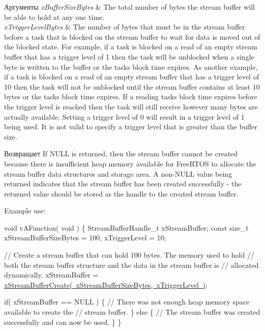 \begin{DoxyParams}{Аргументы}
{\em x\+Buffer\+Size\+Bytes} & The total number of bytes the stream buffer will be able to hold at any one time.\\
\hline
{\em x\+Trigger\+Level\+Bytes} & The number of bytes that must be in the stream buffer before a task that is blocked on the stream buffer to wait for data is moved out of the blocked state. For example, if a task is blocked on a read of an empty stream buffer that has a trigger level of 1 then the task will be unblocked when a single byte is written to the buffer or the task\textquotesingle{}s block time expires. As another example, if a task is blocked on a read of an empty stream buffer that has a trigger level of 10 then the task will not be unblocked until the stream buffer contains at least 10 bytes or the task\textquotesingle{}s block time expires. If a reading task\textquotesingle{}s block time expires before the trigger level is reached then the task will still receive however many bytes are actually available. Setting a trigger level of 0 will result in a trigger level of 1 being used. It is not valid to specify a trigger level that is greater than the buffer size.\\
\hline
\end{DoxyParams}
\begin{DoxyReturn}{Возвращает}
If N\+U\+LL is returned, then the stream buffer cannot be created because there is insufficient heap memory available for Free\+R\+T\+OS to allocate the stream buffer data structures and storage area. A non-\/\+N\+U\+LL value being returned indicates that the stream buffer has been created successfully -\/ the returned value should be stored as the handle to the created stream buffer.
\end{DoxyReturn}
Example use\+: 
\begin{DoxyPre}\end{DoxyPre}



\begin{DoxyPre}void vAFunction( void )
\{
StreamBufferHandle\_t xStreamBuffer;
const size\_t xStreamBufferSizeBytes = 100, xTriggerLevel = 10;\end{DoxyPre}



\begin{DoxyPre}    // Create a stream buffer that can hold 100 bytes.  The memory used to hold
    // both the stream buffer structure and the data in the stream buffer is
    // allocated dynamically.
    xStreamBuffer = \mbox{\hyperlink{stream__buffer_8h_a39aa4dd8b83e2df7ded291f863fb5fed}{xStreamBufferCreate( xStreamBufferSizeBytes, xTriggerLevel )}};\end{DoxyPre}



\begin{DoxyPre}    if( xStreamBuffer == NULL )
    \{
        // There was not enough heap memory space available to create the
        // stream buffer.
    \}
    else
    \{
        // The stream buffer was created successfully and can now be used.
    \}
\}
\end{DoxyPre}
 